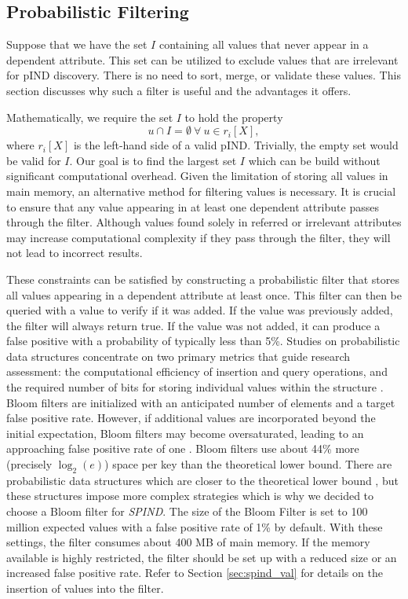\subsection{Probabilistic Filtering}\label{subsec:prob_filter}

Suppose that we have the set $I$ containing all values that never appear in a dependent attribute. This set can be utilized to exclude values that are irrelevant for pIND discovery. There is no need to sort, merge, or validate these values. This section discusses why such a filter is useful and the advantages it offers.

Mathematically, we require the set $I$ to hold the property
$$u \cap I = \emptyset \: \forall \: u \in r_i[X],$$
where $r_i[X]$ is the left-hand side of a valid pIND.
Trivially, the empty set would be valid for $I$. Our goal is to find the largest set $I$ which can be build without significant computational overhead. Given the limitation of storing all values in main memory, an alternative method for filtering values is necessary. It is crucial to ensure that any value appearing in at least one dependent attribute passes through the filter. Although values found solely in referred or irrelevant attributes may increase computational complexity if they pass through the filter, they will not lead to incorrect results.

These constraints can be satisfied by constructing a probabilistic filter that stores all values appearing in a dependent attribute at least once. This filter can then be queried with a value to verify if it was added. If the value was previously added, the filter will always return true. If the value was not added, it can produce a false positive with a probability of typically less than 5\%. Studies on probabilistic data structures concentrate on two primary metrics that guide research assessment: the computational efficiency of insertion and query operations, and the required number of bits for storing individual values within the structure \cite{fan2014cuckoo}. Bloom filters are initialized with an anticipated number of elements and a target false positive rate. However, if additional values are incorporated beyond the initial expectation, Bloom filters may become oversaturated, leading to an approaching false positive rate of one \cite{tarkoma2011theory}. Bloom filters use about 44\% more (precisely $\log_2(e)$) space per key than the theoretical lower bound. There are probabilistic data structures which are closer to the theoretical lower bound \cite{fan2014cuckoo}, but these structures impose more complex strategies which is why we decided to choose a Bloom filter for \textit{SPIND}. The size of the Bloom Filter is set to 100 million expected values with a false positive rate of 1\% by default. With these settings, the filter consumes about 400 MB of main memory. If the memory available is highly restricted, the filter should be set up with a reduced size or an increased false positive rate. Refer to Section \ref{sec:spind_val} for details on the insertion of values into the filter.

